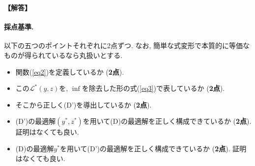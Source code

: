 \documentclass[12pt,a4paper]{article}
\newenvironment{solution}{
    \vspace{0.5em}
    \begin{tcolorbox}[colback=white, colframe=black, boxrule=1pt, arc=0mm, breakable]
    \noindent
    \textbf{【解答】}
    \vspace{0.3em}
}{
    \end{tcolorbox}
    \vspace{1em}
}
\begin{document}
\begin{solution}
  \paragraph*{採点基準.}
  以下の五つのポイントそれぞれに2点ずつ. なお, 簡単な式変形で本質的に等価なものが得られているなら丸扱いとする.
  \begin{itemize}
    \item 関数(\ref{eq2})を定義しているか (\textbf{2点}).
    \item この$\mathcal{L}^*(y,z)$を, $\inf$を除去した形の式(\ref{eq3})で表しているか (\textbf{2点}).
    \item そこから正しく(D')を導出しているか (\textbf{2点}).
    \item (D')の最適解$(y^*,z^*)$を用いて(D)の最適解を正しく構成できているか (\textbf{2点}). 証明はなくても良い.
    \item (D)の最適解$y^*$を用いて(D')の最適解を正しく構成できているか (\textbf{2点}). 証明はなくても良い.
  \end{itemize}
\end{solution}
\end{document}

